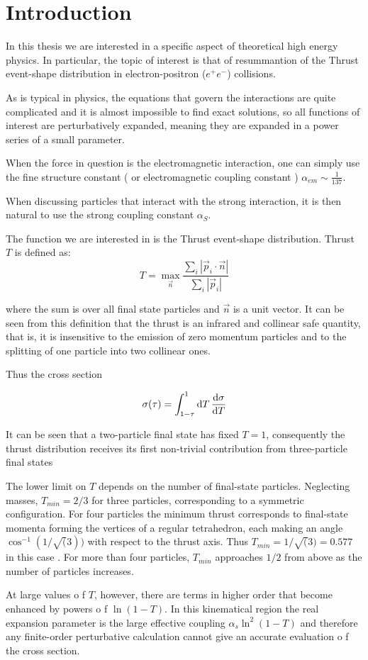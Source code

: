 \documentclass[../main.tex]{subfiles}
\begin{document}
\section{Introduction}

In this thesis we are interested in a specific aspect of theoretical high energy physics. In particular,
the topic of interest is that of resummantion of the Thrust event-shape distribution in electron-positron ($e^+e^-$) collisions.

As is typical in physics, the equations that govern the interactions are quite complicated and it is almost impossible to find exact solutions, so all
functions of interest are perturbatively expanded, meaning they are expanded in a power series of a small parameter. 

When the force in question is the electromagnetic interaction, one can
simply use the fine structure constant ( or electromagnetic coupling constant ) $\alpha_{em} \sim \frac{1}{137} $.

When discussing particles that interact with the strong interaction, it is then natural to use the strong
coupling constant $ \alpha_S $.

The function we are interested in is the Thrust event-shape distribution. Thrust $T$ is defined as:
\begin{equation} \label{eq:Thrust}
    T = \max_{\vec{n}} \frac{\sum_i |\vec{p}_i \cdot \vec{n}|}{\sum_i |\vec{p}_i|}
\end{equation}

where the sum is over all final state particles and $\vec{n}$ is a unit vector.
It can be seen from this definition that the thrust is an infrared and collinear safe
quantity, that is, it is insensitive to the emission of zero momentum particles and to the splitting of 
one particle into two collinear ones.

Thus the cross section 

\begin{equation}\label{eq:cross_section}
    \sigma(\tau) = \int^1_{1-\tau} \dd{T} \dv{\sigma}{T}
\end{equation}

It can be seen that a two-particle final state has fixed $T = 1$, consequently the thrust
distribution receives its first non-trivial contribution from three-particle final states

The lower limit on $T$ depends on the number of final-state particles.
Neglecting masses, $T_{min} = 2/3$ for three particles, corresponding to a symmetric
configuration. For four particles the minimum thrust corresponds to final-state
momenta forming the vertices of a regular tetrahedron, each making an angle
$\cos^{-1}(1/\sqrt(3))$ with respect to the thrust axis. Thus $T_{min} = 1/\sqrt(3) = 0.577$ in this
case . For more than four particles, $T_{min}$ approaches $1/2$ from above as the number of particles increases.

At large values o f $T$, however, there are terms in higher order that become enhanced by powers o f $\ln(1 - T)$.
In this kinematical region the real expansion parameter is the
large effective coupling $\alpha_s \ln^2( 1 - T)$ and therefore
any finite-order perturbative calculation cannot give an accurate evaluation o f the cross section.
\end{document}
